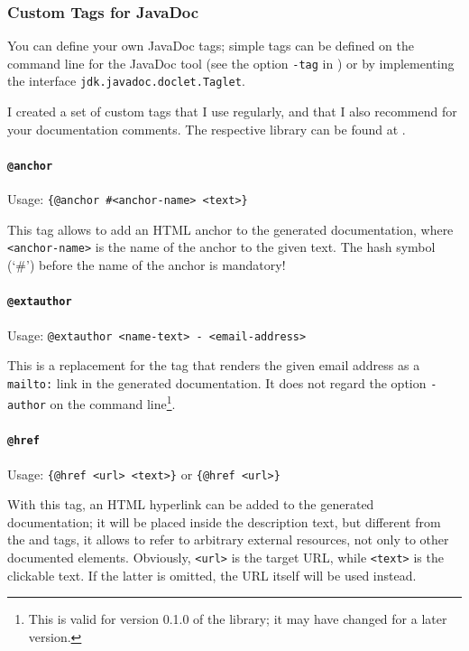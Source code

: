 \documentclass[11pt,a4paper, titlepage, parskip=half, headsepline, footsepline, cleardoublepage=current, headheight=1cm]{scrbook}
\begin{document}

\subsubsection{Custom Tags for JavaDoc}\label{sec:CustomTagsForJavaDoc}
You can define your own JavaDoc tags; simple tags can be defined on the command line for the JavaDoc tool (see the option \verb#-tag# in \autocite{ORACLE_DOC_JAVADOC_MAN:StandardDocletOptions}) or by implementing the interface \lstinline|jdk.javadoc.doclet.Taglet|\autocite{ORACLE_DOC_TAGLET_INTERFACE}.

I created a set of custom tags that I use regularly, and that I also recommend for your documentation comments. The respective library can be found at \autocite{TQUADRAT_ORG_FOUNDATION_JAVADOC}.

\paragraph{\lstinline|@anchor|}\label{sec:TagAnchor}  Usage: \lstinline|{@anchor #<anchor-name> <text>}|

This tag allows to add an HTML anchor to the generated documentation, where \verb#<anchor-name># is the name of the anchor to the given text. The hash symbol (‘\#’) before the name of the anchor is mandatory!

\paragraph{\lstinline|@extauthor|}\label{sec:TagExtAuthor}  Usage: \lstinline|@extauthor <name-text> - <email-address>|

This is a replacement for the  tag that renders the given email address as a \verb#mailto:# link in the generated documentation. It does not regard the option \verb#-author# on the command line\footnote{This is valid for version 0.1.0 of the library; it may have changed for a later version.}. 

\paragraph{\lstinline|@href|}\label{sec:TagHref}  Usage: \lstinline|{@href <url> <text>}| or \lstinline|{@href <url>}|

With this tag, an HTML hyperlink can be added to the generated documentation; it will be placed inside the description text, but different from the  and  tags, it allows to refer to arbitrary external resources, not only to other documented elements. Obviously, \verb#<url># is the target URL, while \verb#<text># is the clickable text. If the latter is omitted, the URL itself will be used instead.
\end{document}
